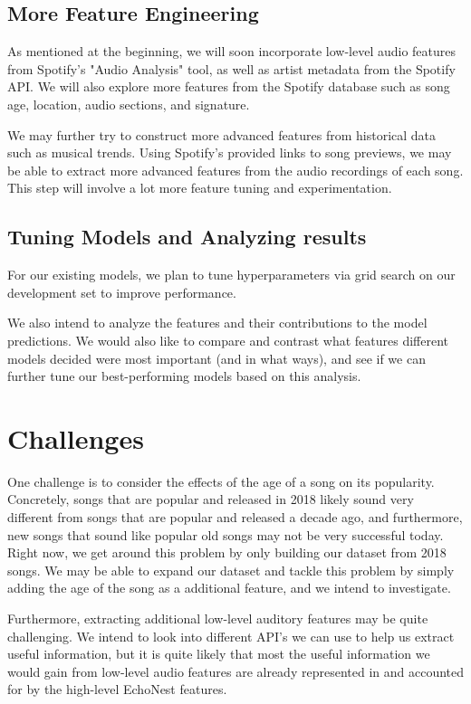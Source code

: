 \documentclass[journal]{IEEEtran}
\begin{document}
\subsection{More Feature Engineering}
As mentioned at the beginning, we will soon incorporate low-level audio features from Spotify's "Audio Analysis" tool, as well as artist metadata from the Spotify API. We will also explore more features from the Spotify database such as song age, location, audio sections, and signature.

We may further try to construct more advanced features from historical data such as musical trends. Using Spotify's provided links to song previews, we may be able to extract more advanced features from the audio recordings of each song. This step will involve a lot more feature tuning and experimentation.

\subsection{Tuning Models and Analyzing results}
For our existing models, we plan to tune hyperparameters via grid search on our development set to improve performance.

We also intend to analyze the features and their contributions to the model predictions. We would also like to compare and contrast what features different models decided were most important (and in what ways), and see if we can further tune our best-performing models based on this analysis.

\section{Challenges}
One challenge is to consider the effects of the age of a song on its popularity. Concretely, songs that are popular and released in 2018 likely sound very different from songs that are popular and released a decade ago, and furthermore, new songs that sound like popular old songs may not be very successful today. Right now, we get around this problem by only building our dataset from 2018 songs. We may be able to expand our dataset and tackle this problem by simply adding the age of the song as a additional feature, and we intend to investigate.

Furthermore, extracting additional low-level auditory features may be quite challenging. We intend to look into different API's we can use to help us extract useful information, but it is quite likely that most the useful information we would gain from low-level audio features are already represented in and accounted for by the high-level EchoNest features.
\end{document}
